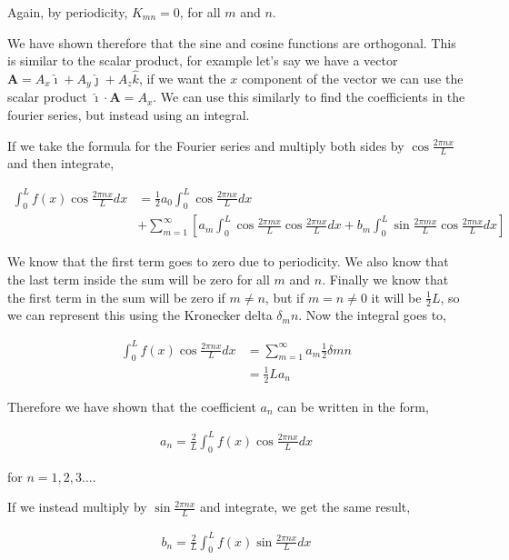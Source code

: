 \documentclass[11pt]{amsart}
\begin{document}
Again, by periodicity, $K_{mn} = 0$, for all $m$ and $n$.

We have shown therefore that the sine and cosine functions are orthogonal. This is similar to the scalar product, for example let's say we have a vector $\mathbf{A} = A_x\hat{\imath}+A_y\hat{\jmath}+A_z\hat{k}$, if we want the $x$ component of the vector we can use the scalar product $\hat{\imath}\cdot\mathbf{A} = A_x$. We can use this similarly to find the coefficients in the fourier series, but instead using an integral.

If we take the formula for the Fourier series and multiply both sides by $\cos{\frac{2\pi nx}{L}}$ and then integrate,

\begin{align*}
  \int_0^L f(x)\cos{\frac{2\pi nx}{L}} dx &= \frac{1}{2} a_0 \int_0^L\cos{\frac{2\pi nx}{L}} dx \\
                                          &+ \sum\limits_{m=1}^{\infty}\left[a_m\int_0^L\cos{\frac{2\pi mx}{L}}\cos{\frac{2\pi nx}{L}} dx + b_m\int_0^L\sin{\frac{2\pi mx}{L}}\cos{\frac{2\pi nx}{L}} dx\right]
\end{align*}

We know that the first term goes to zero due to periodicity. We also know that the last term inside the sum will be zero for all $m$ and $n$. Finally we know that the first term in the sum will be zero if $m \neq n$, but if $m = n \neq 0$ it will be $\frac{1}{2}L$, so we can represent this using the Kronecker delta $\delta_mn$. Now the integral goes to,

\begin{align*}
  \int_0^L f(x)\cos{\frac{2\pi nx}{L}} dx &= \sum_{m=1}^{\infty} a_m\frac{1}{2}\delta{mn} \\
                                          &= \frac{1}{2}L a_n
\end{align*}

Therefore we have shown that the coefficient $a_n$ can be written in the form,

\begin{align*}
  a_n = \frac{2}{L}\int_0^L f(x)\cos{\frac{2\pi nx}{L}} dx
\end{align*}

for $n = 1, 2, 3\dots$.

If we instead multiply by $\sin{\frac{2\pi nx}{L}}$ and integrate, we get the same result,

\begin{align*}
  b_n = \frac{2}{L}\int_0^L f(x)\sin{\frac{2\pi nx}{L}} dx
\end{align*}
\end{document}

